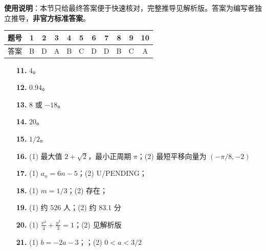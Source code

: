 
\begin{gknotice}
\textbf{使用说明}：本节只给最终答案便于快速核对，完整推导见解析版。答案为编写者独立推导，\textbf{非官方标准答案}。
\end{gknotice}

\begin{center}\begin{tabular}{ccccccccccc}
\toprule
题号 & 1 & 2 & 3 & 4 & 5 & 6 & 7 & 8 & 9 & 10 \\
\midrule
答案 & B & D & A & B & C & D & D & B & C & A \\
\bottomrule
\end{tabular}\end{center}

\begin{itemize}[leftmargin=2.6em]
  \item[\textbf{11.}] $4$。
  \item[\textbf{12.}] $0.94$。
  \item[\textbf{13.}] $8$ 或 $-18$。
  \item[\textbf{14.}] $20$。
  \item[\textbf{15.}] $1/2$。
  \item[\textbf{16.}] (1) 最大值 $2+\sqrt2$，最小正周期 $\pi$；(2) 最短平移向量为 $(-\pi/8,-2)$
\end{itemize}

\begin{itemize}[leftmargin=2.6em]
  \item[\textbf{17.}] (1) $a_n=6n-5$；(2) U/PENDING；
  \item[\textbf{18.}] (1) $m=1/3$；(2) 存在；
  \item[\textbf{19.}] (1) 约 $526$ 人；(2) 约 $83.1$ 分
  \item[\textbf{20.}] (1) $\frac{x^2}{4}+\frac{y^2}{3}=1$；(2) 见解析版
  \item[\textbf{21.}] (1) $b=-2a-3$；；(2) $0<a<3/2$
\end{itemize}
